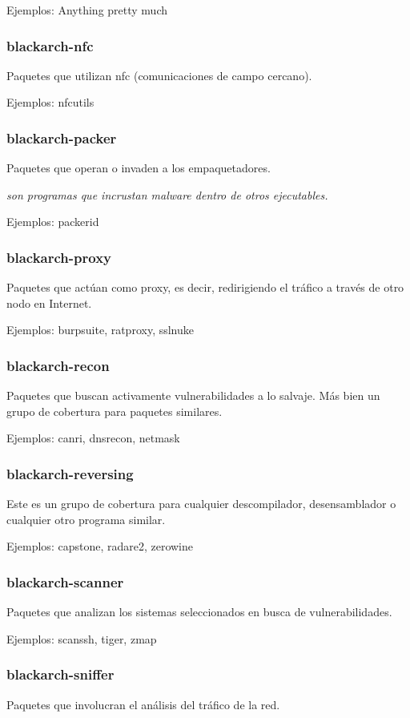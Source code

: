 \documentclass[a4paper, oneside, 11pt]{book}
\begin{document}
Ejemplos: Anything pretty much

\subsubsection{blackarch-nfc}
Paquetes que utilizan nfc (comunicaciones de campo cercano).

Ejemplos: nfcutils

\subsubsection{blackarch-packer}
Paquetes que operan o invaden a los empaquetadores.

\textit{son programas que incrustan malware dentro de otros ejecutables.}

Ejemplos: packerid

\subsubsection{blackarch-proxy}
Paquetes que act\'uan como proxy, es decir, redirigiendo el tr\'afico
a trav\'es de otro nodo en Internet.

Ejemplos: burpsuite, ratproxy, sslnuke

\subsubsection{blackarch-recon}
Paquetes que buscan activamente vulnerabilidades a
lo salvaje. M\'as bien un grupo de cobertura para paquetes similares.

Ejemplos: canri, dnsrecon, netmask

\subsubsection{blackarch-reversing}
Este es un grupo de cobertura para cualquier descompilador,
desensamblador o cualquier otro programa similar.

Ejemplos: capstone, radare2, zerowine

\subsubsection{blackarch-scanner}
Paquetes que analizan los sistemas seleccionados en busca de vulnerabilidades.

Ejemplos: scanssh, tiger, zmap

\subsubsection{blackarch-sniffer}
Paquetes que involucran el an\'alisis del tr\'afico de la red.
\end{document}
